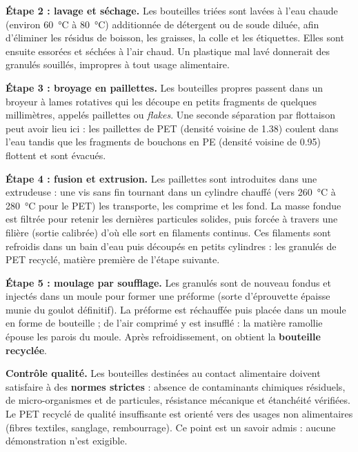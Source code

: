 \documentclass[11pt]{article}
\newcommand{\cle}[1]{{\popxbold\color{popdark}#1}}
\begin{document}
\textbf{Étape 2 : lavage et séchage.} Les bouteilles triées sont lavées à l'eau chaude (environ \SI{60}{\celsius} à \SI{80}{\celsius}) additionnée de détergent ou de soude diluée, afin d'éliminer les résidus de boisson, les graisses, la colle et les étiquettes. Elles sont ensuite essorées et séchées à l'air chaud. Un plastique mal lavé donnerait des granulés souillés, impropres à tout usage alimentaire.

\textbf{Étape 3 : broyage en paillettes.} Les bouteilles propres passent dans un broyeur à lames rotatives qui les découpe en petits fragments de quelques millimètres, appelés \cle{paillettes} ou \emph{flakes}. Une seconde séparation par flottaison peut avoir lieu ici : les paillettes de PET (densité voisine de \num{1,38}) coulent dans l'eau tandis que les fragments de bouchons en PE (densité voisine de \num{0,95}) flottent et sont évacués.

\textbf{Étape 4 : fusion et extrusion.} Les paillettes sont introduites dans une \cle{extrudeuse} : une vis sans fin tournant dans un cylindre chauffé (vers \SI{260}{\celsius} à \SI{280}{\celsius} pour le PET) les transporte, les comprime et les fond. La masse fondue est filtrée pour retenir les dernières particules solides, puis forcée à travers une \cle{filière} (sortie calibrée) d'où elle sort en filaments continus. Ces filaments sont refroidis dans un bain d'eau puis découpés en petits cylindres : les \cle{granulés} de PET recyclé, matière première de l'étape suivante.

\textbf{Étape 5 : moulage par soufflage.} Les granulés sont de nouveau fondus et injectés dans un moule pour former une \cle{préforme} (sorte d'éprouvette épaisse munie du goulot définitif). La préforme est réchauffée puis placée dans un moule en forme de bouteille ; de l'air comprimé y est insufflé : la matière ramollie épouse les parois du moule. Après refroidissement, on obtient la \textbf{bouteille recyclée}.

\textbf{Contrôle qualité.} Les bouteilles destinées au contact alimentaire doivent satisfaire à des \textbf{normes strictes} : absence de contaminants chimiques résiduels, de micro-organismes et de particules, résistance mécanique et étanchéité vérifiées. Le PET recyclé de qualité insuffisante est orienté vers des usages non alimentaires (fibres textiles, sanglage, rembourrage). Ce point est un savoir admis : aucune démonstration n'est exigible.
\end{document}
